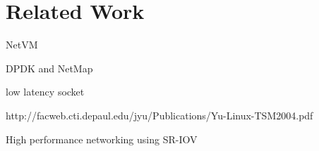 \section{Related Work} \label{sec:related}

NetVM  \cite{netvm}

DPDK and NetMap \cite{netmap}

low latency socket

http://facweb.cti.depaul.edu/jyu/Publications/Yu-Linux-TSM2004.pdf

High performance networking using SR-IOV \cite{highsriov}